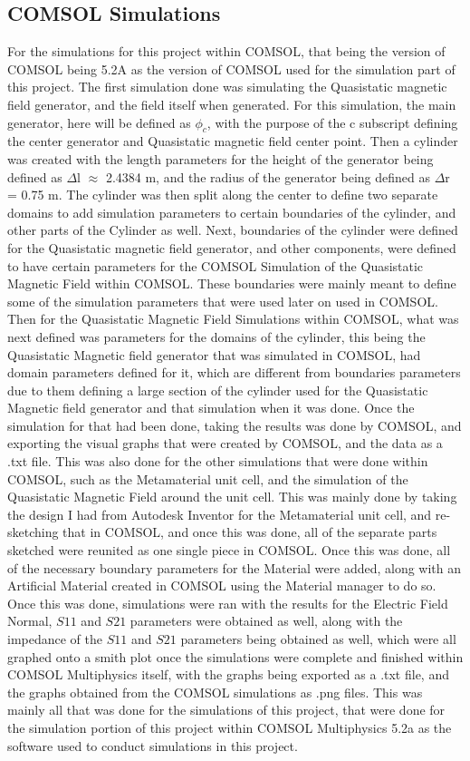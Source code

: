\documentclass[]{article}
\begin{document}
\subsection*{COMSOL Simulations}
For the simulations for this project within COMSOL, that being the version of COMSOL being 5.2A as the version of COMSOL used for the simulation part of this project. The first simulation done was simulating the Quasistatic magnetic field generator, and the field itself when generated. For this simulation, the main generator, here will be defined as $\phi_c$, with the purpose of the c subscript defining the center generator and Quasistatic magnetic field center point. Then a cylinder was created with the length parameters for the height of the generator being defined as $\Delta$l $\approx$ 2.4384 m, and the radius of the generator being defined as $\Delta$r = 0.75 m. The cylinder was then split along the center to define two separate domains to add simulation parameters to certain boundaries of the cylinder, and other parts of the Cylinder as well. Next, boundaries of the cylinder were defined for the Quasistatic magnetic field generator, and other components, were defined to have certain parameters for the COMSOL Simulation of the Quasistatic Magnetic Field within COMSOL. These boundaries were mainly meant to define some of the simulation parameters that were used later on used in COMSOL. Then for the Quasistatic Magnetic Field Simulations within COMSOL, what was next defined was parameters for the domains of the cylinder, this being the Quasistatic Magnetic field generator that was simulated in COMSOL, had domain parameters defined for it, which are different from boundaries parameters due to them defining a large section of the cylinder used for the Quasistatic Magnetic field generator and that simulation when it was done. Once the simulation for that had been done, taking the results was done by COMSOL, and exporting the visual graphs that were created by COMSOL, and the data as a .txt file. This was also done for the other simulations that were done within COMSOL, such as the Metamaterial unit cell, and the simulation of the Quasistatic Magnetic Field around the unit cell. This was mainly done by taking the design I had from Autodesk Inventor for the Metamaterial unit cell, and re-sketching that in COMSOL, and once this was done, all of the separate parts sketched were reunited as one single piece in COMSOL. Once this was done, all of the necessary boundary parameters for the Material were added, along with an Artificial Material created in COMSOL using the Material manager to do so. Once this was done, simulations were ran with the results for the Electric Field Normal, $S11$ and $S21$ parameters were obtained as well, along with the impedance of the $S11$ and $S21$ parameters being obtained as well, which were all graphed onto a smith plot once the simulations were complete and finished within COMSOL Multiphysics itself, with the graphs being exported as a .txt file, and the graphs obtained from the COMSOL simulations as .png files. This was mainly all that was done for the simulations of this project, that were done for the simulation portion of this project within COMSOL Multiphysics 5.2a as the software used to conduct simulations in this project.
\end{document}
